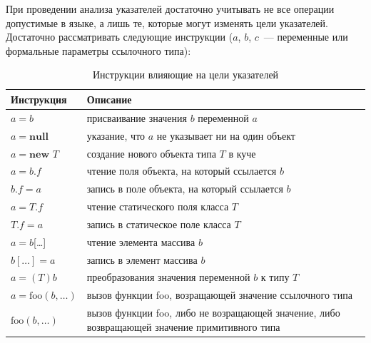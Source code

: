 \documentclass[14pt,titlepage]{extarticle}
\newcommand{\NEW}{\textbf{new }}
\newcommand{\NULL}{\textbf{null }}
\begin{document}
      При проведении анализа указателей достаточно учитывать не все операции
      допустимые в языке, а лишь те, которые могут изменять цели указателей.
      Достаточно рассматривать следующие инструкции ($a$, $b$, $c$~---
      переменные или формальные параметры ссылочного типа):
      \begin{table}
        \begin{tabular}{|l|p{120mm}|}\hline
          \textbf{Инструкция} & \textbf{Описание}\\ \hline

          $a = b$
          & присваивание значения $b$ переменной $a$ \\ \hline

          $a = \NULL$
          & указание, что $a$ не указывает ни на один объект \\ \hline

          $a = \NEW T$
          & создание нового объекта типа $T$ в куче \\ \hline

          $a = b.f$
          & чтение поля объекта, на который ссылается $b$ \\ \hline

          $b.f = a$
          & запись в поле объекта, на который ссылается $b$ \\ \hline

          $a = T.f$
          & чтение статического поля класса $T$ \\ \hline

          $T.f = a$
          & запись в статическое поле класса $T$ \\ \hline

          $a = b$[\ldots]
          & чтение элемента массива $b$ \\ \hline

          $b[\ldots] = a$
          & запись в элемент массива $b$ \\ \hline

          $a = (T)b$
          & преобразования значения переменной $b$ к типу $T$ \\ \hline

          $a = \textrm{foo}(b, \ldots)$
          & вызов функции foo, возращающей значение ссылочного типа \\ \hline

          $\textrm{foo}(b, \ldots)$
          & вызов функции foo, либо не возращающей значение, либо возвращающей значение примитивного типа \\ \hline
        \end{tabular}
        \caption{Инструкции влияющие на цели указателей}
        \label{tabular:instructions}
      \end{table}
\end{document}
